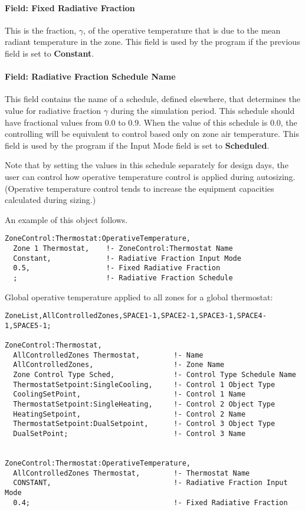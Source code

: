 \paragraph{Field: Fixed Radiative Fraction}\label{field-fixed-radiative-fraction}

This is the fraction, \(\gamma\), of the operative temperature that is due to the mean radiant temperature in the zone. This field is used by the program if the previous field is set to \textbf{Constant}.

\paragraph{Field: Radiative Fraction Schedule Name}\label{field-radiative-fraction-schedule-name}

This field contains the name of a schedule, defined elsewhere, that determines the value for radiative fraction \(\gamma\) during the simulation period. This schedule should have fractional values from 0.0 to 0.9. When the value of this schedule is 0.0, the controlling will be equivalent to control based only on zone air temperature. This field is used by the program if the Input Mode field is set to \textbf{Scheduled}.

Note that by setting the values in this schedule separately for design days, the user can control how operative temperature control is applied during autosizing. (Operative temperature control tends to increase the equipment capacities calculated during sizing.)

An example of this object follows.

\begin{lstlisting}
ZoneControl:Thermostat:OperativeTemperature,
  Zone 1 Thermostat,    !- ZoneControl:Thermostat Name
  Constant,             !- Radiative Fraction Input Mode
  0.5,                  !- Fixed Radiative Fraction
  ;                     !- Radiative Fraction Schedule
\end{lstlisting}

Global operative temperature applied to all zones for a global thermostat:

\begin{lstlisting}
ZoneList,AllControlledZones,SPACE1-1,SPACE2-1,SPACE3-1,SPACE4-1,SPACE5-1;

ZoneControl:Thermostat,
  AllControlledZones Thermostat,        !- Name
  AllControlledZones,                   !- Zone Name
  Zone Control Type Sched,              !- Control Type Schedule Name
  ThermostatSetpoint:SingleCooling,     !- Control 1 Object Type
  CoolingSetPoint,                      !- Control 1 Name
  ThermostatSetpoint:SingleHeating,     !- Control 2 Object Type
  HeatingSetpoint,                      !- Control 2 Name
  ThermostatSetpoint:DualSetpoint,      !- Control 3 Object Type
  DualSetPoint;                         !- Control 3 Name


ZoneControl:Thermostat:OperativeTemperature,
  AllControlledZones Thermostat,        !- Thermostat Name
  CONSTANT,                             !- Radiative Fraction Input Mode
  0.4;                                  !- Fixed Radiative Fraction
\end{lstlisting}

